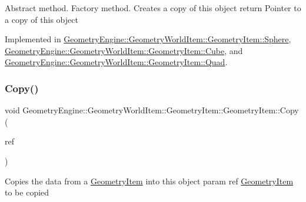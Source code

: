 Abstract method. Factory method. Creates a copy of this object return Pointer to a copy of this object 

Implemented in \mbox{\hyperlink{class_geometry_engine_1_1_geometry_world_item_1_1_geometry_item_1_1_sphere_aaf5b7221c60ac1feefaacff14a20c1f3}{Geometry\+Engine\+::\+Geometry\+World\+Item\+::\+Geometry\+Item\+::\+Sphere}}, \mbox{\hyperlink{class_geometry_engine_1_1_geometry_world_item_1_1_geometry_item_1_1_cube_ab151cd962c45bc06d21e9e26c2d1c4aa}{Geometry\+Engine\+::\+Geometry\+World\+Item\+::\+Geometry\+Item\+::\+Cube}}, and \mbox{\hyperlink{class_geometry_engine_1_1_geometry_world_item_1_1_geometry_item_1_1_quad_ad3a6d04a38253d1f26735a87a53a5446}{Geometry\+Engine\+::\+Geometry\+World\+Item\+::\+Geometry\+Item\+::\+Quad}}.

\mbox{\label{class_geometry_engine_1_1_geometry_world_item_1_1_geometry_item_1_1_geometry_item_a13a2a225acb39c559601c2151b4322bf}} 
\subsubsection{\texorpdfstring{Copy()}{Copy()}}
{\footnotesize\ttfamily void Geometry\+Engine\+::\+Geometry\+World\+Item\+::\+Geometry\+Item\+::\+Geometry\+Item\+::\+Copy (\begin{DoxyParamCaption}\item[{const \mbox{\hyperlink{class_geometry_engine_1_1_geometry_world_item_1_1_geometry_item_1_1_geometry_item}{Geometry\+Item}} \&}]{ref }\end{DoxyParamCaption})\hspace{0.3cm}{\ttfamily [virtual]}}

Copies the data from a \mbox{\hyperlink{class_geometry_engine_1_1_geometry_world_item_1_1_geometry_item_1_1_geometry_item}{Geometry\+Item}} into this object param ref \mbox{\hyperlink{class_geometry_engine_1_1_geometry_world_item_1_1_geometry_item_1_1_geometry_item}{Geometry\+Item}} to be copied \mbox{\label{class_geometry_engine_1_1_geometry_world_item_1_1_geometry_item_1_1_geometry_item_a263a106b8c225c7e30f2788fb4a3e4bc}} 
